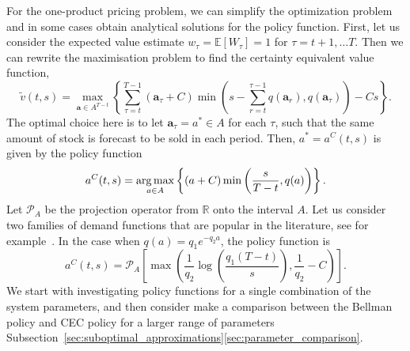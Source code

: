 \documentclass[main.tex]{subfiles}
\begin{document}
For the one-product pricing problem, we can simplify the optimization
problem and in some cases obtain analytical solutions for the policy function.
First, let us consider the expected value estimate $w_\tau=\mathbb E
[W_\tau]=1$ for $\tau=t+1,\dots T$.
Then we can rewrite the maximisation problem to find
the certainty equivalent value function,
\begin{equation}
  \widetilde{v}(t,s)=
  \max_{\mathbf a\in A^{T-t}}\left\{\sum_{\tau=t}^{T-1}(\mathbf
    a_\tau+C)\min\left(s-\sum_{r=t}^{\tau-1}q(\mathbf a_r),q(\mathbf a_\tau)\right)-Cs\right\}.
\end{equation}
The optimal choice here is to let $\mathbf a_\tau=a^*\in A$ for each
$\tau$, such that the same amount of stock is forecast to be sold in
each period.
Then, $a^*=a^C(t,s)$ is given by the policy function
\begin{equation}
  a^C(t,s)=\operatorname*{arg\,max}_{a\in A} \left\{(a+C)\min\left(
      \frac{s}{T-t},q(a)
    \right)\right\}.
\end{equation}
Let $\mathcal P_A$ be the projection operator from $\mathbb R$ onto the interval $A$.
Let us consider two families of demand functions that are
popular in the literature, see for example~\cite[Ch.~7]{talluri2006theory}.
In the case when $q(a)=q_1e^{-q_2a}$, the policy function is
\begin{equation}\label{eq:cec_policy}
  a^C(t,s)=\mathcal P_A\left[
    \max\left( \frac{1}{q_2}\log\left( \frac{q_1(T-t)}{s}\right),
      \frac{1}{q_2}-C  \right)\right].
\end{equation}
We start with investigating policy functions for a
single combination of the  system
parameters, and then consider make a
comparison between the Bellman policy and CEC policy for a larger
range of parameters Subsection~\ref{sec:suboptimal_approximations}\ref{sec:parameter_comparison}.
\end{document}
